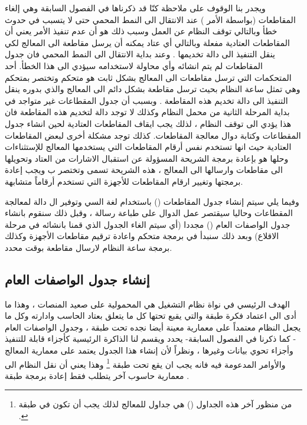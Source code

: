 \documentclass[document.tex]{subfiles}
\begin{document}
ويجدر بنا الوقوف على ملاحظة كنّا قد ذكرناها في الفصول السابقة وهي إلغاء المقاطعات (بواسطة الأمر ) عند الانتقال الى النمط المحمي حتى لا يتسبب في حدوث خطأ  وبالتالي توقف النظام عن العمل وسبب ذلك هو أن عدم تنفيذ الأمر  يعني أن المقاطعات العتادية مفعلة وبالتالي أي عتاد يمكنه أن يرسل مقاطعة الى المعالج لكي ينقل التنفيذ الى دالة تخديمها . وعند بداية الانتقال الى النمط المحمي فان جدول المقاطعات  لم يتم انشائه وأي محاولة لاستخدامه سيؤدي الى هذا الخطأ. أحد المتحكمات التي ترسل مقاطعات الى المعالج بشكل ثابت هو متحكم  وتختصر بمتحكم  وهي تمثل ساعة النظام  بحيث ترسل مقاطعة بشكل دائم الى المعالج والذي بدوره ينقل التنفيذ الى دالة تخديم هذه المقاطعة . وبسبب أن جدول المقطاعات غير متواجد في بداية المرحلة الثانية من محمل النظام وكذلك لا توجد دالة لتخديم هذه المقاطعة فان هذا يؤدي الى توقف النظام ، لذلك يجب ايقاف المقاطعات العتادية لحين انشاء جدول المقطاعات وكتابة دوال معالجة المقاطعات. كذلك توجد مشكلة أخرى لبعض المقاطعات العتادية حيث انها تستخدم نفس أرقام المقاطعات التي يستخدمها المعالج للإستثناءات وحلها هو بإعادة برمجة الشريحة المسؤولة عن استقبال الاشارات من العتاد وتحويلها الى مقاطعات وارسالها الى المعالج ، هذه الشريحة تسمى  وتختصر ب  ويجب إعادة برمجتها وتغيير ارقام المقاطعات للأجهزة التي تستخدم أرقاماً متشابهة.

وفيما يلي سيتم إنشاء جدول المقاطعات () باستخدام لغة السي وتوفير ال  دالة لمعالجة المقطاعات وحاليا سيقتصر عمل الدوال على طباعة رسالة ، وقبل ذلك سنقوم بانشاء جدول الواصفات العام () مجددا (أي سيتم الغاء الجدول الذي قمنا بانشائه في مرحلة الاقلاع) وبعد ذلك سنبدأ في برمجة متحكم  واعادة ترقيم مقاطعات الأجهزة وكذلك برمجة ساعة النظام لارسال مقاطعة بوقت محدد.  

\subsection{إنشاء جدول الواصفات العام }
الهدف الرئيسي في نواة نظام التشغيل هي المحمولية على صعيد المنصات ، وهذا ما أدى الى اعتماد فكرة طبقة  والتي يقبع تحتها كل ما يتعلق بعتاد الحاسب وادارته وكل ما يجعل النظام معتمداً على معمارية معينة أيضا نجده تحت طبقة  ، وجدول الواصفات العام - كما ذكرنا في الفصول السابقة- يحدد ويقسم لنا الذاكرة الرئيسية كأجزاء قابلة للتنفيذ وأجزاء تحوي بيانات وغيرها ، ونظراً لأن إنشاء هذا الجدول يعتمد على معمارية المعالج والأوامر المدعومة فيه فانه يجب ان يقع تحت طبقة \footnote{من منظور آخر هذه الجداول () هي جداول للمعالج لذلك يجب أن تكون في طبقة .} وهذا يعني أن نقل النظام الى معمارية حاسوب آخر يتطلب فقط إعادة برمجة طبقة  .
\end{document}
